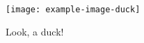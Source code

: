 \documentclass{article}
\begin{document}
\begin{figure}
\centering
\texttt{[image: example-image-duck]}
\caption{Look, a duck!}
\end{figure}

\duckument
\end{document}
